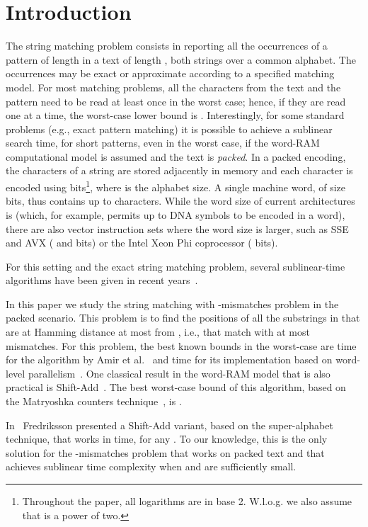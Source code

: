 \documentclass{llncs}
\newcommand{\sabound}{\xspace}
\begin{document}
\section{Introduction}
\noindent
The string matching problem consists in reporting all the occurrences
of a pattern  of length  in a text  of length , both strings over a common alphabet. The
occurrences may be exact or approximate according to a specified
matching model.
For most matching problems, all the characters from the text and the
pattern need to be read at least once in the worst case; hence, if
they are read one at a time, the worst-case lower bound is
.
Interestingly, for some standard problems (e.g., exact pattern
matching) it is possible to achieve a sublinear search time, for short
patterns, even in the worst case, if the word-RAM computational model
is assumed and the text is {\em packed}. In a packed encoding, the
characters of a string are stored adjacently in memory and each
character is encoded using 
bits\footnote{Throughout the paper, all logarithms are in base 2.
  W.l.o.g. we also assume that  is a power of two.}, where
 is the alphabet size. A single machine word, of size  bits, thus contains up to 
characters.
While the word size of current architectures is  (which, for
example, permits up to  DNA symbols to be encoded in a word), there are also
vector instruction sets where the word size is larger, such as SSE and
AVX ( and  bits) or the Intel Xeon Phi coprocessor (
bits).


For this setting and the exact string matching problem, several
sublinear-time algorithms have been given in recent
years~\cite{Fredriksson2002,Bille2011,Belazzougui2012jda,Ben-KikiBBGGW2011,BreslauerGG2012}.

In this paper we study the string matching with -mismatches problem
in the packed scenario. This problem is to find
the positions of all the substrings in  that are at Hamming
distance at most  from , i.e., that match  with at most 
mismatches. For this problem, the best known bounds in the worst-case
are  time for the algorithm by Amir et
al.~\cite{DBLP:journals/jal/AmirLP04} and 
time for its implementation based on word-level
parallelism~\cite{DBLP:journals/ejc/FredrikssonG13}. One classical
result in the word-RAM model that is also practical is Shift-Add~\cite{DBLP:journals/cacm/Baeza-YatesG92}.
The best worst-case bound of this algorithm, based on the Matryoshka counters
technique~\cite{DBLP:journals/ipl/GrabowskiF08}, is .

In~\cite{Fredriksson2002} Fredriksson presented a Shift-Add variant,
based on the super-alphabet technique, that works in \sabound time,
for any . To our knowledge, this is the only solution
for the -mismatches problem that works on packed text and that
achieves sublinear time complexity when  and  are sufficiently
small.
\end{document}
